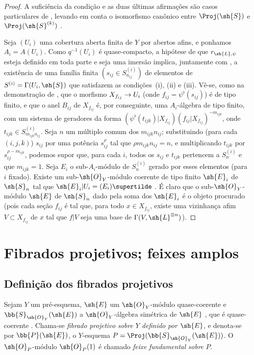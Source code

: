 \documentclass[oneside,10pt]{amsart}
\makeatletter
\newcommand{\ega@arrow}[2]{\mathchoice{#1}{#2}{#2}{#2}}
\renewcommand{\to}{\ega@arrow{\longrightarrow}{\rightarrow}}
\newcommand{\oldpage}[2][]{\marginnote{\normalfont\footnotesize\textbf{#1}~|~#2}\ignorespaces}
\let\EGAOriginalLabel\label
\renewcommand{\label}[1]{\phantomsection\EGAOriginalLabel{#1}}
\makeatother
\begin{document}
\begin{proof}
A suficiência da condição e as duas últimas afirmações são casos particulares de , levando em conta o isomorfismo canônico entre $\Proj(\sh{S})$ e $\Proj(\sh{S}^{(k)})$ .

Seja $(U_i)$ uma cobertura aberta finita de $Y$ por abertos afins, e ponhamos $A_i=A(U_i)$.
Como $q^{-1}(U_i)$ é quase-compacto, a hipótese de que $r_{\sh{L},\psi}$ esteja definido em toda parte e seja uma imersão implica, juntamente com , a existência de uma família finita $(s_{ij}\in S_{n_{ij}}^{(i)})$ de elementos de $S^{(i)}=\Gamma(U_i,\sh{S})$ que satisfazem as condições~(i), (ii) e (iii).
Vê-se, como na demonstração de , que o morfismo $X_{f_{ij}}\to U_i$ (onde $f_{ij}=\psi^\flat(s_{ij})$) é de tipo finito, e que o anel $B_{ij}$ de $X_{f_{ij}}$ é, por conseguinte, uma $A_i$-álgebra de tipo finito, com um sistema de geradores da forma $(\psi^\flat(t_{ijk})|X_{f_{ij}})(f_{ij}|X_{f_{ij}})^{-m_{ijk}}$, onde $t_{ijk}\in S_{m_{ijk}n_{ij}}^{(i)}$.
Seja $n$ um múltiplo comum dos $m_{ijk}n_{ij}$;
substituindo (para cada $(i,j,k)$) $s_{ij}$ por uma potência $s_{ij}^\rho$ tal que $\rho m_{ijk}n_{ij}=n$, e multiplicando $t_{ijk}$ por $s_{ij}^{\rho-m_{ijk}}$, podemos supor que, para cada $i$, todos os $s_{ij}$ e $t_{ijk}$ pertencem a $S_n^{(i)}$ e que $m_{ijk}=1$.
Seja $E_i$ o sub-$A_i$-módulo de $S_n^{(i)}$ gerado por esses elementos (para $i$ fixado).
Existe um sub-$\sh{O}_Y$-módulo coerente de tipo finito $\sh{E}_i$ de $\sh{S}_n$ tal que $\sh{E}_i|U_i=(E_i)\supertilde$ .
\oldpage[II]{71}
É claro que o sub-$\sh{O}_Y$-módulo $\sh{E}$ de $\sh{S}_n$ dado pela soma dos $\sh{E}_i$ é o objeto procurado (pois cada seção $f_{ij}$ é tal que, para todo $x\in X_{f_{ij}}$, existe uma vizinhança afim $V\subset X_{f_{ij}}$ de $x$ tal que $f|V$ seja uma base de $\Gamma(V,\sh{L}^{\otimes n})$).
\end{proof}

\section{Fibrados projetivos; feixes amplos}
\label{section:II.4}


\subsection{Definição dos fibrados projetivos}
\label{subsection:II.4.1}

\begin{definition}[4.1.1]
\label{II.4.1.1}
Sejam $Y$ um pré-esquema, $\sh{E}$ um $\sh{O}_Y$-módulo quase-coerente e $\bb{S}_{\sh{O}_Y}(\sh{E})$ a $\sh{O}_Y$-álgebra simétrica de $\sh{E}$ , que é quase-coerente .
Chama-se \emph{fibrado projetivo sobre $Y$ definido por $\sh{E}$}, e denota-se por $\bb{P}(\sh{E})$, o $Y$-esquema $P=\Proj(\bb{S}_{\sh{O}_Y}(\sh{E}))$.
O $\sh{O}_P$-módulo $\sh{O}_P(1)$ é chamado \emph{feixe fundamental sobre $P$}.
\end{definition}
\end{document}
